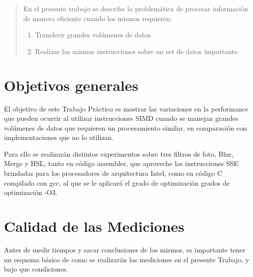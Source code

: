 \documentclass[a4paper]{article}
\begin{document}
\thispagestyle{empty}

\maketitle
\newpage

\thispagestyle{empty}
\vfill
\begin{abstract}
En el presente trabajo se describe la problemática de procesar información de manera eficiente cuando los mismos requieren:
\begin{enumerate}
\item Transferir grandes volúmenes de datos.
\item Realizar las mismas instrucciones sobre un set de datos importante.
\end{enumerate}
\end{abstract}
\thispagestyle{empty}
\vspace{3cm}
\tableofcontents
\newpage

\section{Objetivos generales}
El objetivo de este Trabajo Práctico es mostrar las variaciones en la performance que pueden ocurrir al utilizar instrucciones SIMD cuando se manejan grandes volúmenes de datos que requieren un procesamiento similar, en comparación con implementaciones que no lo utilizan.

Para ello se realizarán distintos experimentos sobre tres filtros de foto, Blur, Merge y HSL, tanto en código assembler, que aproveche las instrucciones SSE brindadas para los procesadores de arquitectura Intel, como en código C compilado con gcc, al que se le aplicará el grado de optimización grados de optimización -O3.


\section{Calidad de las Mediciones}
Antes de medir tiempos y sacar conclusiones de los mismos, es importante tener un esquema básico de como se realizarán las mediciones en el presente Trabajo, y bajo que condiciones.
\end{document}
